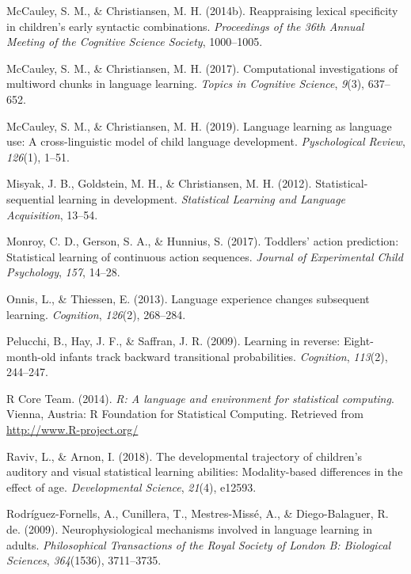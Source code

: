 \documentclass[man,mask,floatsintext]{apa6}
\theoremstyle{definition}
\theoremstyle{definition}
\theoremstyle{definition}
\theoremstyle{remark}
\begin{document}
\hypertarget{ref-mccauley2014reappraising}{}
McCauley, S. M., \& Christiansen, M. H. (2014b). Reappraising lexical
specificity in children's early syntactic combinations.
\emph{Proceedings of the 36th Annual Meeting of the Cognitive Science
Society}, 1000--1005.

\hypertarget{ref-mccauley2017computational}{}
McCauley, S. M., \& Christiansen, M. H. (2017). Computational
investigations of multiword chunks in language learning. \emph{Topics in
Cognitive Science}, \emph{9}(3), 637--652.

\hypertarget{ref-mccauley2019languagelearning}{}
McCauley, S. M., \& Christiansen, M. H. (2019). Language learning as
language use: A cross-linguistic model of child language development.
\emph{Pyschological Review}, \emph{126}(1), 1--51.

\hypertarget{ref-misyak2012statistical}{}
Misyak, J. B., Goldstein, M. H., \& Christiansen, M. H. (2012).
Statistical-sequential learning in development. \emph{Statistical
Learning and Language Acquisition}, 13--54.

\hypertarget{ref-monroy2017toddlers}{}
Monroy, C. D., Gerson, S. A., \& Hunnius, S. (2017). Toddlers' action
prediction: Statistical learning of continuous action sequences.
\emph{Journal of Experimental Child Psychology}, \emph{157}, 14--28.

\hypertarget{ref-onnis2013language}{}
Onnis, L., \& Thiessen, E. (2013). Language experience changes
subsequent learning. \emph{Cognition}, \emph{126}(2), 268--284.

\hypertarget{ref-pelucchi2009learning}{}
Pelucchi, B., Hay, J. F., \& Saffran, J. R. (2009). Learning in reverse:
Eight-month-old infants track backward transitional probabilities.
\emph{Cognition}, \emph{113}(2), 244--247.

\hypertarget{ref-R}{}
R Core Team. (2014). \emph{R: A language and environment for statistical
computing}. Vienna, Austria: R Foundation for Statistical Computing.
Retrieved from \url{http://www.R-project.org/}

\hypertarget{ref-raviv2018developmental}{}
Raviv, L., \& Arnon, I. (2018). The developmental trajectory of
children's auditory and visual statistical learning abilities:
Modality-based differences in the effect of age. \emph{Developmental
Science}, \emph{21}(4), e12593.

\hypertarget{ref-rodriguez2009neurophysiological}{}
Rodríguez-Fornells, A., Cunillera, T., Mestres-Missé, A., \&
Diego-Balaguer, R. de. (2009). Neurophysiological mechanisms involved in
language learning in adults. \emph{Philosophical Transactions of the
Royal Society of London B: Biological Sciences}, \emph{364}(1536),
3711--3735.
\end{document}
